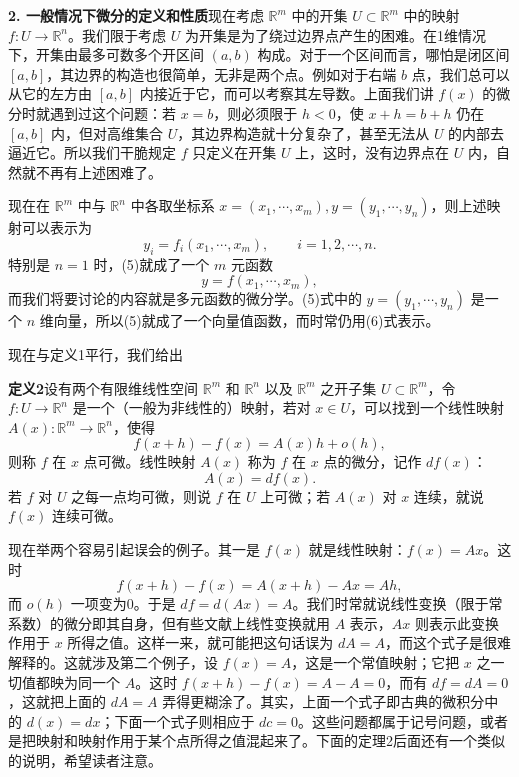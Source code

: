 \noindent\textbf{2. 一般情况下微分的定义和性质}\quad 现在考虑 $\mathbb R^m$ 中的开集 $U\subset\mathbb R^m$ 中的映射 $f:U\to\mathbb R^n$。我们限于考虑 $U$ 为开集是为了绕过边界点产生的困难。在1维情况下，开集由最多可数多个开区间 $(a,b)$ 构成。对于一个区间而言，哪怕是闭区间 $[a,b]$，其边界的构造也很简单，无非是两个点。例如对于右端 $b$ 点，我们总可以从它的左方由 $[a,b]$ 内接近于它，而可以考察其左导数。上面我们讲 $f(x)$ 的微分时就遇到过这个问题：若 $x=b$，则必须限于 $h<0$，使 $x+h=b+h$ 仍在 $[a,b]$ 内，但对高维集合 $U$，其边界构造就十分复杂了，甚至无法从 $U$ 的内部去逼近它。所以我们干脆规定 $f$ 只定义在开集 $U$ 上，这时，没有边界点在 $U$ 内，自然就不再有上述困难了。

现在在 $\mathbb R^m$ 中与 $\mathbb R^n$ 中各取坐标系 $x=(x_1,\cdots,x_m),y=(y_1,\cdots,y_n)$，则上述映射可以表示为
\begin{equation}
 y_i=f_i(x_1,\cdots,x_m),\qquad i=1,2,\cdots,n.
 \tag{5}
\end{equation}
特别是 $n=1$ 时，(5)就成了一个 $m$ 元函数
\begin{equation}
 y=f(x_1,\cdots,x_m),
 \tag{6}
\end{equation}
而我们将要讨论的内容就是多元函数的微分学。(5)式中的 $y=(y_1,\cdots,y_n)$ 是一个 $n$ 维向量，所以(5)就成了一个向量值函数，而时常仍用(6)式表示。

现在与定义1平行，我们给出

\noindent\textbf{定义2}\quad 设有两个有限维线性空间 $\mathbb R^m$ 和 $\mathbb R^n$ 以及 $\mathbb R^m$ 之开子集 $U\subset\mathbb R^m$，令 $f:U\to\mathbb R^n$ 是一个（一般为非线性的）映射，若对 $x\in U$，可以找到一个线性映射 $A(x):\mathbb R^m\to\mathbb R^n$，使得
\begin{equation}
 f(x+h)-f(x)=A(x)h+o(h),
 \tag{7}
\end{equation}
则称 $f$ 在 $x$ 点可微。线性映射 $A(x)$ 称为 $f$ 在 $x$ 点的微分，记作 $df(x)$：
\begin{equation}
 A(x)=df(x).
 \tag{8}
\end{equation}
若 $f$ 对 $U$ 之每一点均可微，则说 $f$ 在 $U$ 上可微；若 $A(x)$ 对 $x$ 连续，就说 $f(x)$ 连续可微。

现在举两个容易引起误会的例子。其一是 $f(x)$ 就是线性映射：$f(x)=Ax$。这时
\[
 f(x+h)-f(x)=A(x+h)-Ax=Ah,
\]
而 $o(h)$ 一项变为0。于是 $df=d(Ax)=A$。我们时常就说线性变换（限于常系数）的微分即其自身，但有些文献上线性变换就用 $A$ 表示，$Ax$ 则表示此变换作用于 $x$ 所得之值。这样一来，就可能把这句话误为 $dA=A$，而这个式子是很难解释的。这就涉及第二个例子，设 $f(x)=A$，这是一个常值映射；它把 $x$ 之一切值都映为同一个 $A$。这时 $f(x+h)-f(x)=A-A=0$，而有 $df=dA=0$，这就把上面的 $dA=A$ 弄得更糊涂了。其实，上面一个式子即古典的微积分中的 $d(x)=dx$；下面一个式子则相应于 $dc=0$。这些问题都属于记号问题，或者是把映射和映射作用于某个点所得之值混起来了。下面的定理2后面还有一个类似的说明，希望读者注意。

